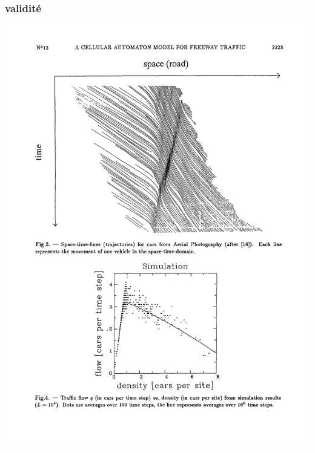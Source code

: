 \documentclass[slidetop,11pt]{beamer}
\begin{document}
\begin{frame}
\frametitle{validité}
\includegraphics[scale = 0.7]{dfondcomp}

\end{frame}
\end{document}
